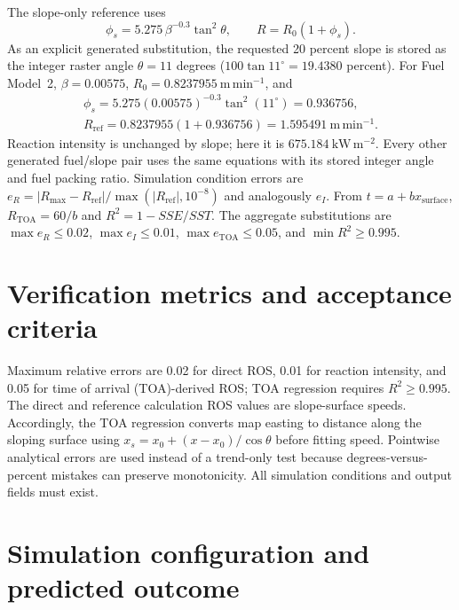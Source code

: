The slope-only reference uses
\[
 \phi_s=5.275\,\beta^{-0.3}\tan^2\theta,\qquad
 R=R_0(1+\phi_s).
\]
As an explicit generated substitution, the requested 20 percent slope is
stored as the integer raster angle \(\theta=11\) degrees
(\(100\tan11^\circ=19.4380\) percent).  For Fuel Model~2,
\(\beta=0.00575\), \(R_0=0.8237955~\mathrm{m\,min^{-1}}\), and
\[
 \begin{gathered}\phi_s=5.275(0.00575)^{-0.3}\tan^2(11^\circ)=0.936756,\\
 R_{\mathrm{ref}}=0.8237955(1+0.936756)
 =1.595491~\mathrm{m\,min^{-1}}.\end{gathered}
\]
Reaction intensity is unchanged by slope; here it is
\(675.184~\mathrm{kW\,m^{-2}}\).  Every other generated fuel/slope pair
uses the same equations with its stored integer angle and fuel packing
ratio.  Simulation condition errors are
\(e_R=|R_{\max}-R_{\mathrm{ref}}|/\max(|R_{\mathrm{ref}}|,10^{-8})\)
and analogously \(e_I\).  From \(t=a+bx_{\mathrm{surface}}\),
\(R_{\mathrm{TOA}}=60/b\) and \(R^2=1-SSE/SST\).
The aggregate substitutions are \(\max e_R\leq0.02\),
\(\max e_I\leq0.01\), \(\max e_{\mathrm{TOA}}\leq0.05\), and
\(\min R^2\geq0.995\).

\section{Verification metrics and acceptance criteria}
Maximum relative errors are 0.02 for direct ROS, 0.01 for reaction intensity, and 0.05 for time of arrival (TOA)-derived ROS; TOA regression requires $R^2\ge0.995$. The direct and reference calculation ROS values are slope-surface speeds. Accordingly, the TOA regression converts map easting to distance along the sloping surface using $x_s=x_0+(x-x_0)/\cos\theta$ before fitting speed. Pointwise analytical errors are used instead of a trend-only test because degrees-versus-percent mistakes can preserve monotonicity.  All simulation conditions and output fields must exist.

\section{Simulation configuration and predicted outcome}

